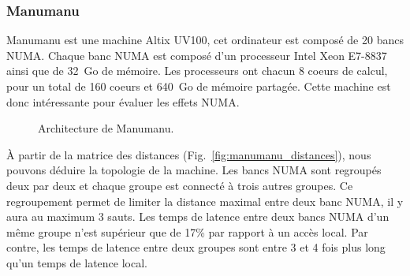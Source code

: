 \subsubsection{Manumanu}
Manumanu est une machine Altix UV100, cet ordinateur est composé de 20 bancs NUMA.
%
Chaque banc NUMA est composé d'un processeur Intel Xeon E7-8837 ainsi que de 32~Go de mémoire.
%
Les processeurs ont chacun 8 coeurs de calcul, pour un total de 160 coeurs et 640~Go de mémoire partagée.
%
Cette machine est donc intéressante pour évaluer les effets NUMA.

\begin{figure}[!h]
     \begin{center}
    \end{center}
    \caption{Architecture de Manumanu.}
    \label{fig:manumanu}
\end{figure}

\`{A} partir de la matrice des distances (Fig.~\ref{fig:manumanu_distances}), nous pouvons déduire la topologie de la machine.
%
Les bancs NUMA sont regroupés deux par deux et chaque groupe est connecté à trois autres groupes.
%
Ce regroupement permet de limiter la distance maximal entre deux banc NUMA, il y aura au maximum 3 sauts.
%
Les temps de latence entre deux bancs NUMA d'un même groupe n'est supérieur que de 17\% par rapport à un accès local.
%
Par contre, les temps de latence entre deux groupes sont entre 3 et 4 fois plus long qu'un temps de latence local.
